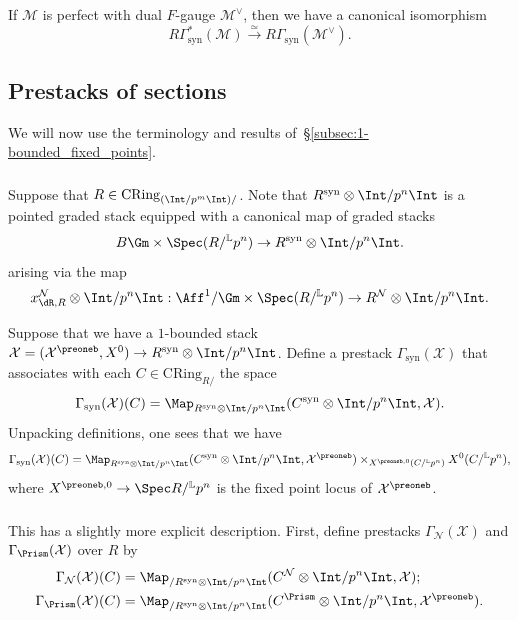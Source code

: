 \documentclass[10pt]{amsart}
\begin{document}
\begin{remark}
\label{rem:syn_cohom-perfect_f-gauges}
If $\mathcal{M}$ is perfect with dual $F$-gauge $\mathcal{M}^\vee$, then we have a canonical isomorphism
\[
R\Gamma^*_{\mathrm{syn}}(\mathcal{M})\xrightarrow{\simeq}R\Gamma_{\mathrm{syn}}(\mathcal{M}^\vee).
\]
\end{remark}   


\subsection{Prestacks of sections}
\label{subsec:prestacks_of_sections}
We will now use the terminology and results of~\S\ref{subsec:1-bounded_fixed_points}.

\subsubsection{}
Suppose that $R\in \mathrm{CRing}_{(\Int/p^m\Int)/}$. Note that $R^{\mathrm{syn}}\otimes\Int/p^n\Int$ is a pointed graded stack equipped with a canonical map of graded stacks
\[
B\Gm\times \Spec(R/{}^{\mathbb{L}}p^n)\to R^{\mathrm{syn}}\otimes\Int/p^n\Int.
\]
arising via the map  
\[
x^{\mathcal{N}}_{\dR,R}\otimes\Int/p^n\Int:\Aff^1/\Gm\times  \Spec(R/{}^{\mathbb{L}}p^n)\to R^{\mathcal{N}}\otimes\Int/p^n\Int.
\]


Suppose that we have a $1$-bounded stack $\mathcal{X}= (\mathcal{X}^\preoneb,X^0)\to R^{\mathrm{syn}}\otimes\Int/p^n\Int$.  Define a prestack $\Gamma_{\mathrm{syn}}(\mathcal{X})$ that associates with each $C\in \mathrm{CRing}_{R/}$ the space
\[
\Gamma_{\mathrm{syn}}(\mathcal{X})(C) = \Map_{R^{\mathrm{syn}}\otimes\Int/p^n\Int}(C^{\mathrm{syn}}\otimes\Int/p^n\Int,\mathcal{X}).
\]
Unpacking definitions, one sees that we have
\[
\Gamma_{\mathrm{syn}}(\mathcal{X})(C) = \Map_{R^{\mathrm{syn}}\otimes\Int/p^n\Int}(C^{\mathrm{syn}}\otimes\Int/p^n\Int,\mathcal{X}^\preoneb)\times_{X^{\preoneb,0}(C/{}^{\mathbb{L}}p^n)}X^0(C/{}^{\mathbb{L}}p^n),
\]
where $X^{\preoneb,0}\to \Spec R/{}^{\mathbb{L}}p^n$ is the fixed point locus of $\mathcal{X}^\preoneb$.

\subsubsection{}
This has a slightly more explicit description. First, define prestacks $\Gamma_{\mathcal{N}}(\mathcal{X})$ and $\Gamma_{\Prism}(\mathcal{X})$ over $R$ by
\begin{align*}
\Gamma_{\mathcal{N}}(\mathcal{X})(C) &= \Map_{/R^{\mathrm{syn}}\otimes\Int/p^n\Int}(C^{\mathcal{N}}\otimes\Int/p^n\Int,\mathcal{X});\\
\Gamma_{\Prism}(\mathcal{X})(C) &= \Map_{/R^{\mathrm{syn}}\otimes\Int/p^n\Int}(C^{\Prism}\otimes\Int/p^n\Int,\mathcal{X}^\preoneb).
\end{align*}
\end{document}
